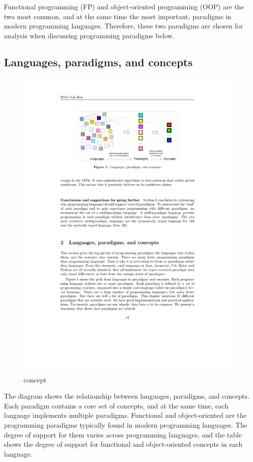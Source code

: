 Functional programming (FP) and object-oriented programming (OOP) are the two most common, and at the same time the most important, paradigms in modern programming languages. Therefore, these two paradigms are chosen for analysis when discussing programming paradigms below.

\subsection{Languages, paradigms, and concepts}

\begin{figure}[htbp]
    \centerline{\includegraphics[scale=0.8]{figures/concept}}
    \caption{concept}
    \label{fig:concept}
\end{figure}

The diagram shows the relationship between languages, paradigms, and concepts. Each paradigm contains a core set of concepts, and at the same time, each language implements multiple paradigms. Functional and object-oriented are the programming paradigms typically found in modern programming languages. The degree of support for them varies across programming languages, and the table shows the degree of support for functional and object-oriented concepts in each language.

